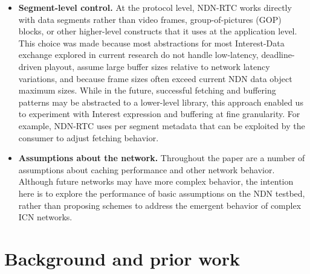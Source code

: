 \documentclass{icn/sig-alternate-2013} %
\newcommand{\ndnrtcName}{NDN-RTC} %
\begin{document}
\begin{itemize} 

\item \textbf{Segment-level control.}  At the protocol level, \ndnrtcName{} works directly with data segments rather than video frames, group-of-pictures (GOP) blocks, or other higher-level constructs that it uses at the application level.  %
This choice was made because most abstractions for most Interest-Data exchange explored in current research do not handle low-latency, deadline-driven playout, assume large buffer sizes relative to network latency variations, and because frame sizes often exceed current NDN data object maximum sizes. 
While in the future, successful fetching and buffering patterns may be abstracted to a lower-level library, this approach enabled us to experiment with Interest expression and buffering at fine granularity. For example, \ndnrtcName{} uses per segment metadata that can be exploited by the consumer to adjust fetching behavior. %

\item \textbf{Assumptions about the network.}  Throughout the paper are a number of assumptions about caching performance and other network behavior. Although future networks may have more complex behavior, the intention here is to explore the performance of basic assumptions on the NDN testbed, rather than proposing schemes to address the emergent behavior of complex ICN networks.

\end{itemize}


\section{Background and prior work}
\label{sec:bg}

\end{document}
